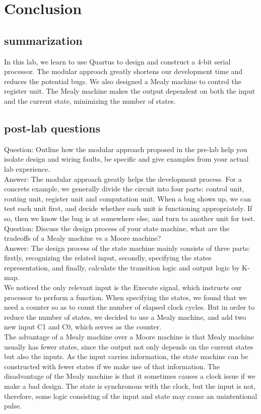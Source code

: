 \documentclass[12pt]{article}
\begin{document}
\section{Conclusion}
\subsection{summarization}
In this lab, we learn to use Quartus to design and construct a 4-bit serial processor. The modular approach greatly shortens our development time and reduces the potential bugs. We also designed a Mealy machine to control the register unit. The Mealy machine makes the output dependent on both the input and the current state, minimizing the number of states. 

\subsection{post-lab questions}
Question: Outline how the modular approach proposed in the pre-lab help you isolate design and wiring faults, be specific and give examples from your actual lab experience. \\

Answer: The modular approach greatly helps the development process. For a concrete example, we generally divide the circuit into four parts: control unit, routing unit, register unit and computation unit. When a bug shows up, we can test each unit first, and decide whether each unit is functioning appropriately. If so, then we know the bug is at somewhere else, and turn to another unit for test. \\

Question: Discuss the design process of your state machine, what are the tradeoffs of a Mealy machine vs a Moore machine? \\

Answer: The design process of the state machine mainly consists of three parts: firstly, recognizing the related input, secondly, specifying the states representation, and finally, calculate the transition logic and output logic by K-map. \\
We noticed the only relevant input is the Execute signal, which instructs our processor to perform a function. When specifying the states, we found that we need a counter so as to count the number of elapsed clock cycles. But in order to reduce the number of states, we decided to use a Mealy machine, and add two new input C1 and C0, which serves as the counter. \\ 
The advantage of a Mealy machine over a Moore machine is that Mealy machine usually has fewer states, since the output not only depends on the current states but also the inputs. As the input carries information, the state machine can be constructed with fewer states if we make use of that information. The disadvantage of the Mealy machine is that it sometimes causes a clock issue if we make a bad design. The state is synchronous with the clock, but the input is not, therefore, some logic consisting of the input and state may cause an unintentional pulse.
\end{document}
